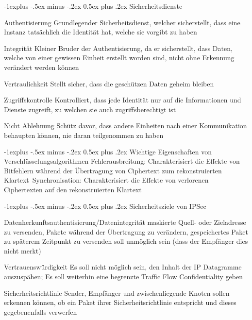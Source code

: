 \documentclass[10pt,landscape]{article}
\makeatletter
\renewcommand{\subsection}{\@startsection{subsection}{2}{0mm}%
                                {-1explus -.5ex minus -.2ex}%
                                {0.5ex plus .2ex}%
                                {\normalfont\normalsize\bfseries}}
\makeatother
\begin{document}
\begin{multicols}{3}
    \subsection{Sicherheitsdienste}
    \begin{description*}
        \item[Authentisierung] Grundlegender Sicherheitsdienst, welcher sicherstellt, dass eine Instanz tatsächlich die Identität hat, welche sie vorgibt zu haben
        \item[Integrität] Kleiner Bruder der Authentisierung, da er sicherstellt, dass Daten, welche von einer gewissen Einheit erstellt worden sind, nicht ohne Erkennung verändert werden können
        \item[Vertraulichkeit] Stellt sicher, dass die geschützen Daten geheim bleiben
        \item[Zugriffskontrolle] Kontrolliert, dass jede Identität nur auf die Informationen und Dienste zugreift, zu welchen sie auch zugriffsberechtigt ist
        \item[Nicht Ablehnung] Schütz davor, dass andere Einheiten nach einer Kommunikation behaupten können, nie daran teilgenommen zu haben
    \end{description*}
    
    \subsection{Wichtige Eigenschaften von Verschlüsselungsalgorithmen}
    Fehlerausbreitung: Charakterisiert die Effekte von Bitfehlern während der Übertragung von Ciphertext zum rekonstruierten Klartext\
    Synchronisation: Charakterisiert die Effekte von verlorenen Ciphertexten auf den rekonstruierten Klartext
    
    \subsection{Sicherheitsziele von IPSec}
    \begin{description*}
        \item[Datenherkunftsauthentisierung/Datenintegrität] maskierte Quell- oder Zieladresse zu versenden, Pakete während der Übertragung zu verändern, gespeichertes Paket zu späterem Zeitpunkt zu versenden soll unmöglich sein (dass der Empfänger dies nicht merkt)
        \item[Vertrauenswürdigkeit] Es soll nicht möglich sein, den Inhalt der IP Datagramme auszuspähen; Es soll weiterhin eine begrenzte Traffic Flow Confidentiality geben
        \item[Sicherheitsrichtlinie] Sender, Empfänger und zwischenliegende Knoten sollen erkennen können, ob ein Paket ihrer Sicherheitsrichtlinie entspricht und dieses gegebenenfalls verwerfen
    \end{description*}
    

\end{multicols}
\end{document}
